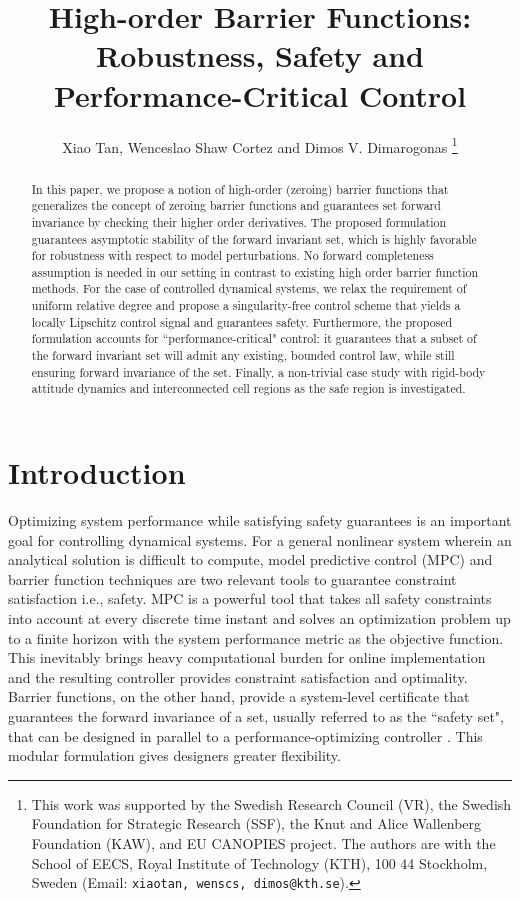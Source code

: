 \documentclass[letterpaper, 10 pt, journal, twoside]{IEEEtran}
\title{
High-order  Barrier Functions: Robustness, Safety and Performance-Critical Control
}
\author{Xiao Tan, Wenceslao Shaw Cortez and Dimos V. Dimarogonas %
\thanks{This work was supported by the Swedish Research Council (VR),
the Swedish Foundation for Strategic Research (SSF), the Knut and Alice
Wallenberg Foundation (KAW), and EU CANOPIES project.
The authors are with the School of EECS, Royal Institute of Technology (KTH), 100 44 Stockholm, Sweden (Email: 
        {\tt\small xiaotan, wenscs, dimos@kth.se}).}
}
\theoremstyle{plain}
\begin{document}
\maketitle
\thispagestyle{plain}
\pagestyle{plain}


\begin{abstract}
  In this paper, we propose a notion of high-order (zeroing) barrier functions that generalizes the concept of zeroing barrier functions and guarantees set forward invariance by checking their higher order derivatives. The proposed formulation guarantees asymptotic stability of the forward invariant set, which is highly favorable for robustness with respect to model perturbations. No forward completeness assumption is needed in our setting in contrast to existing high order barrier function methods. For the case of controlled dynamical systems, we relax the requirement of uniform relative degree and propose a singularity-free control scheme that yields a locally Lipschitz control signal and guarantees safety. Furthermore, the proposed formulation accounts for ``performance-critical" control: it guarantees that a subset of the forward invariant set will admit any existing, bounded control law, while still ensuring forward invariance of the set. Finally, a non-trivial case study with rigid-body attitude dynamics and interconnected cell regions as the safe region  is investigated.
 
\end{abstract}


\section{Introduction}
 
 
 Optimizing system performance while satisfying safety guarantees is an important goal for controlling dynamical systems. For a general nonlinear system {wherein} an analytical solution is difficult to compute, model predictive control (MPC) and barrier function techniques are two relevant tools to guarantee constraint satisfaction i.e., safety. MPC  \cite{garcia1989model,mayne2000constrained,camacho2013model} is a powerful tool that takes all safety constraints into account at every discrete time instant and solves an optimization problem up to a {finite horizon} with the system performance metric as the objective function. This inevitably brings heavy computational burden for online implementation and the resulting controller {provides} constraint satisfaction and {optimality}. Barrier functions, on the other hand,  provide a system-level certificate that guarantees the forward invariance of a set, {usually referred to} as the ``safety set", that can be designed  in parallel to {a performance-optimizing controller}  \cite{romdlony2014uniting}. This modular formulation gives designers {greater flexibility}.
 
\end{document}
